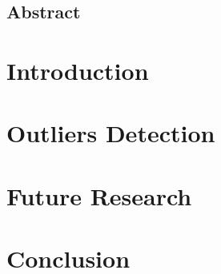\documentclass[11pt,a4paper,twoside,openright]{report}
\begin{document}





\begin{Prolog}

\chapter*{Abstract}




\cleardoublepage

\tableofcontents


%


%

	
\end{Prolog}

\StartBody

\chapter{Introduction}



%

\chapter{Outliers Detection}










\chapter{Future Research}



\chapter{Conclusion}







%


%
%
\end{document}
